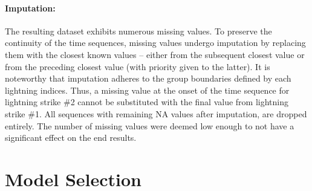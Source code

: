 


\paragraph{Imputation:}
The resulting dataset exhibits numerous missing values. To preserve the continuity of the time sequences, missing values undergo imputation by replacing them with the closest known values -- either from the subsequent closest value or from the preceding closest value (with priority given to the latter). It is noteworthy that imputation adheres to the group boundaries defined by each lightning indices. Thus, a missing value at the onset of the time sequence for lightning strike \#2 cannot be substituted with the final value from lightning strike \#1. All sequences with remaining NA values after imputation, are dropped entirely. The number of missing values were deemed low enough to not have a significant effect on the end results.

\newpage
\section{Model Selection}

